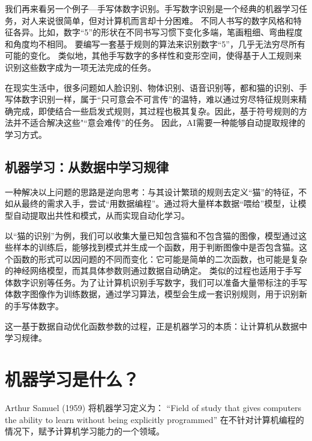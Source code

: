我们再来看另一个例子---手写体数字识别。手写数字识别\cite{lecun1989backpropagation}是一个经典的机器学习任务，对人来说很简单，但对计算机而言却十分困难。
不同人书写的数字风格和特征各异。比如，数字“5”的形状在不同书写习惯下变化多端，笔画粗细、弯曲程度和角度均不相同。
要编写一套基于规则的算法来识别数字“5”，几乎无法穷尽所有可能的变化。
类似地，其他手写数字的多样性和变形空间，使得基于人工规则来识别这些数字成为一项无法完成的任务。

在现实生活中，很多问题如人脸识别、物体识别、语音识别等，都和猫的识别、手写体数字识别一样，属于“只可意会不可言传”的温特，难以通过穷尽特征规则来精确完成，即使结合一些启发式规则，其过程也极其复杂。因此，基于符号规则的方法并不适合解决这些"“意会难传”的任务。
因此，AI需要一种能够自动提取规律的学习方式。

\subsection{机器学习：从数据中学习规律}
一种解决以上问题的思路是逆向思考：与其设计繁琐的规则去定义“猫”的特征，不如从最终的需求入手，尝试“用数据编程”。通过将大量样本数据“喂给”模型，让模型自动提取出共性和模式，从而实现自动化学习。

以“猫的识别”为例，我们可以收集大量已知包含猫和不包含猫的图像，模型通过这些样本的训练后，能够找到模式并生成一个函数，用于判断图像中是否包含猫。这个函数的形式可以因问题的不同而变化：它可能是简单的二次函数，也可能是复杂的神经网络模型，而其具体参数则通过数据自动确定。
类似的过程也适用于手写体数字识别等任务。为了让计算机识别手写数字，我们可以准备大量带标注的手写体数字图像作为训练数据，通过学习算法，模型会生成一套识别规则，用于识别新的手写体数字。

这一基于数据自动优化函数参数的过程，正是机器学习的本质：让计算机从数据中学习规律。

\section{机器学习是什么？}\label{sec:机器学习}

Arthur Samuel (1959) 将机器学习定义为：
“Field of study that gives computers the ability to learn without being explicitly programmed”
在不针对计算机编程的情况下，赋予计算机学习能力的一个领域。

